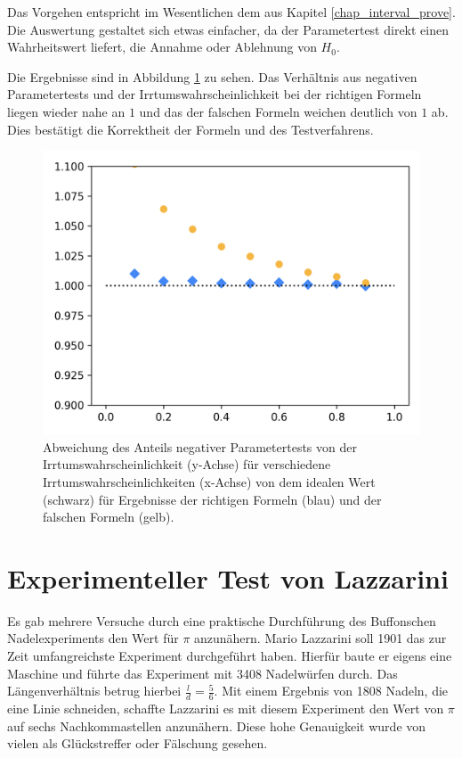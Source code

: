 \documentclass[10pt,twocolumn]{scrartcl}
\begin{document}
		Das Vorgehen entspricht im Wesentlichen dem aus Kapitel \ref{chap_interval_prove}. Die Auswertung gestaltet sich etwas einfacher, da der Parametertest direkt einen Wahrheitswert liefert, die Annahme oder Ablehnung von $H_0$.

		Die Ergebnisse sind in Abbildung \ref{fig_test_mean_dot} zu sehen. Das Verhältnis aus negativen Parametertests und der Irrtumswahrscheinlichkeit bei der richtigen Formeln liegen wieder nahe an $1$ und das der falschen Formeln weichen deutlich von $1$ ab. Dies bestätigt die Korrektheit der Formeln und des Testverfahrens.

		\begin{figure}[H]
			\centering
			\includegraphics[width=0.9\columnwidth]{images/mean_test.png}
			\caption{Abweichung des Anteils negativer Parametertests von der Irrtumswahrscheinlichkeit (y-Achse) für verschiedene Irrtumswahrscheinlichkeiten (x-Achse) von dem idealen Wert (schwarz) für Ergebnisse der richtigen Formeln (blau) und der falschen Formeln (gelb).}
			\label{fig_test_mean_dot}
		\end{figure}

\section{Experimenteller Test von Lazzarini}
	Es gab mehrere Versuche durch eine praktische Durchführung des Buffonschen Nadelexperiments den Wert für $\pi$ anzunähern. Mario Lazzarini soll 1901 das zur Zeit umfangreichste Experiment durchgeführt haben. Hierfür baute er eigens eine Maschine und führte das Experiment mit 3408 Nadelwürfen durch. Das Längenverhältnis betrug hierbei ${\tfrac {l}{d}={\tfrac {5}{6}}}$. Mit einem Ergebnis von 1808 Nadeln, die eine Linie schneiden, schaffte Lazzarini es mit diesem Experiment den Wert von $\pi$ auf sechs Nachkommastellen anzunähern. Diese hohe Genauigkeit wurde von vielen als Glückstreffer oder Fälschung gesehen.\cite{Badger}
\end{document}
